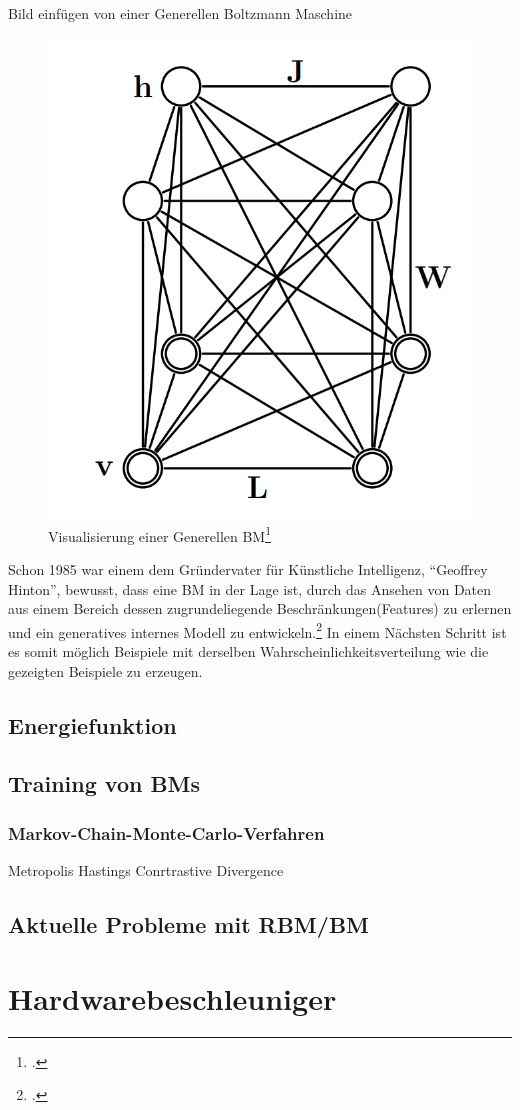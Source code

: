 \large Bild einfügen von einer Generellen Boltzmann Maschine

\begin{figure}[H]
    \centering
    \includegraphics[width=0.3\linewidth]{graphics/General_BM.png}
    \caption{Visualisierung einer Generellen \ac{BM}\footcite[Vgl.][449]{salakhutdinovDeepBoltzmannMachines2009}}
\end{figure}

Schon 1985 war einem dem Gründervater für Künstliche Intelligenz, ``Geoffrey Hinton'', bewusst, dass eine \ac{BM} in der Lage ist, durch das Ansehen von Daten aus einem Bereich dessen zugrundeliegende Beschränkungen(Features) zu erlernen und ein generatives internes Modell zu entwickeln.\footcite[Vgl.][148]{ackleyLearningAlgorithmBoltzmann1985}
In einem Nächsten Schritt ist es somit möglich Beispiele mit derselben Wahrscheinlichkeitsverteilung wie die gezeigten Beispiele zu erzeugen.



\subsection{Energiefunktion}
\subsection{Training von BMs}
\subsubsection{Markov-Chain-Monte-Carlo-Verfahren}
Metropolis Hastings 
Conrtrastive Divergence

\subsection{Aktuelle Probleme mit RBM/BM}



\section{Hardwarebeschleuniger}
